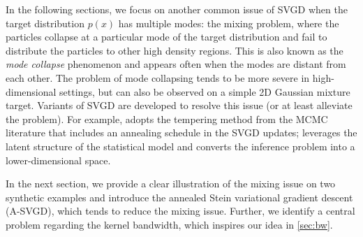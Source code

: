 In the following sections, we focus on another common issue of SVGD when the target
distribution $p(x)$ has multiple modes: the mixing problem, where the
particles collapse at a particular mode of the target distribution and fail
to distribute the particles to other high density regions. This is also known
as the \emph{mode collapse} phenomenon \citep{zhuo2018message,d2021annealed}
and appears often when the modes are distant from each other. The problem of
mode collapsing tends to be more severe in high-dimensional settings, but can
also be observed on a simple 2D Gaussian mixture target. Variants of SVGD are developed to resolve this issue (or at least alleviate the problem). 
For example, \citet{d2021annealed} adopts the tempering method from the MCMC literature \citep{zhang2019cyclical} that includes an annealing schedule in the SVGD updates; 
\citet{zhuo2018message} leverages the latent structure of the statistical model and converts the inference problem into a lower-dimensional space. 

In the next section,
we provide a clear illustration of the mixing issue on two synthetic examples
and introduce the annealed Stein variational gradient descent (A-SVGD), which tends to reduce the mixing issue. 
Further, we identify a central problem regarding the kernel bandwidth, which inspires our idea in \cref{sec:bw}.




